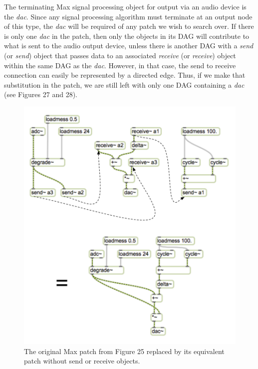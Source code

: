 \documentclass[12pt]{report} 	%
\numberwithin{figure}{chapter}
\numberwithin{table}{chapter}
\numberwithin{equation}{chapter}
\begin{document}
\begin{flushleft}
The terminating Max signal processing object for output via an audio device is the \textit{dac\texttildelow{}}. Since any signal processing algorithm must terminate at an output node of this type, the \textit{dac\texttildelow{}} will be required of any patch we wish to search over. If there is only one \textit{dac\texttildelow{}} in the patch, then only the objects in its DAG will contribute to what is sent to the audio output device, unless there is another DAG with a \textit{send\texttildelow{}} (or \textit{send}) object that passes data to an associated \textit{receive\texttildelow{}} (or \textit{receive}) object within the same DAG as the \textit{dac\texttildelow{}}. However, in that case, the send to receive connection can easily be represented by a directed edge. Thus, if we make that substitution in the patch, we are still left with only one DAG containing a \textit{dac\texttildelow{}} (see Figures 27 and 28).
\begin{figure}[h!]
\begin{center}
\includegraphics[scale=0.75]{MaxDAGsSendReceive1}
\caption[Removing send\texttildelow{} and receive\texttildelow{} objects]{The original Max patch from Figure 25 replaced by its equivalent patch without send\texttildelow{} or receive\texttildelow{} objects.}

\end{center}
\end{figure}
\end{flushleft}
\end{document}
